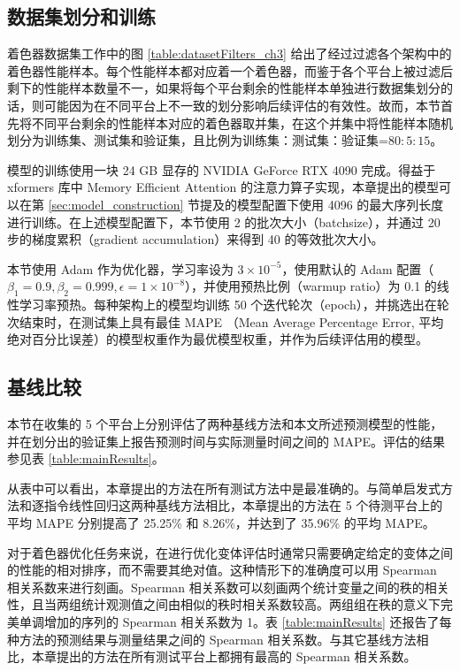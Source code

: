 \subsection{数据集划分和训练}
\label{sec:split_and_training}

{\amend 着色器数据集工作中的}图 \ref{table:datasetFilters_ch3} 给出了经过过滤各个架构中的着色器性能样本。每个性能样本都对应着一个着色器，而鉴于各个平台上被过滤后剩下的性能样本数量不一，如果将每个平台剩余的性能样本单独进行数据集划分的话，则可能因为在不同平台上不一致的划分影响后续评估的有效性。故而，{\amend 本节}首先将不同平台剩余的性能样本对应的着色器取并集，在这个并集中将性能样本随机划分为训练集、测试集和验证集，且比例为训练集：测试集：验证集=$80:5:15$。

模型的训练使用一块 24 GB 显存的 NVIDIA GeForce RTX 4090 完成。得益于 xformers \cite{xFormers2022}库中 Memory Efficient Attention 的注意力算子实现\cite{rabe2022selfattention}，{\amend 本章提出的}模型可以在第 \ref{sec:model_construction} 节提及的模型配置下使用 4096 的最大序列长度进行训练。在上述模型配置下，{\amend 本节}使用 2 的批次大小（batchsize），并通过 20 步的梯度累积（gradient accumulation）来得到 40 的等效批次大小。

{\amend 本节}使用 Adam \cite{Kingma2014AdamAM} 作为优化器，学习率设为 $3 \times 10^{-5}$，使用默认的 Adam 配置（$\beta_1=0.9, \beta_2=0.999, \epsilon=1 \times 10^{-8}$），并使用预热比例（warmup ratio）为 0.1 的线性学习率预热。每种架构上的模型均训练 50 个迭代轮次（epoch），并挑选出在轮次结束时，在测试集上具有最佳 MAPE （Mean Average Percentage Error, 平均绝对百分比误差）的模型权重作为最优模型权重，并作为后续评估用的模型。

\subsection{基线比较}

{\amend 本节}在收集的 5 个平台上分别评估了两种基线方法和本文所述预测模型的性能，并在划分出的验证集上报告预测时间与实际测量时间之间的 MAPE。评估的结果参见表 \ref{table:mainResults}。

从表中可以看出，本章提出的方法在所有测试方法中是最准确的。与简单启发式方法和逐指令线性回归这两种基线方法相比，{\amend 本章}提出的方法在 5 个待测平台上的平均 MAPE 分别提高了 25.25\% 和 8.26\%，并达到了 35.96\% 的平均 MAPE。

对于着色器优化任务来说，在进行优化变体评估时通常只需要确定给定的变体之间的性能的相对排序，而不需要其绝对值。这种情形下的准确度可以用 Spearman 相关系数来进行刻画。Spearman 相关系数可以刻画两个统计变量之间的秩的相关性，且当两组统计观测值之间由相似的秩时相关系数较高。两组组在秩的意义下完美单调增加的序列的 Spearman 相关系数为 1。表 \ref{table:mainResults} 还报告了每种方法的预测结果与测量结果之间的 Spearman 相关系数。与其它基线方法相比，{\amend 本章提出的}方法在所有测试平台上都拥有最高的 Spearman 相关系数。

